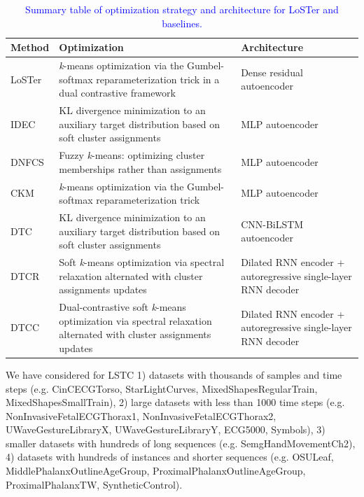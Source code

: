 \documentclass[times, review, 10pt]{elsarticle}
\begin{document}
\begin{table}[!tb]
  \caption{\textcolor{blue}{Summary table of optimization strategy and architecture for LoSTer and baselines.}}
  \label{summary-table}
  \vskip 0.1in
  \centering
  {\small
  \begin{tabularx}{\linewidth}{lX X}
    \toprule
    \textbf{Method} & \textbf{Optimization} & \textbf{Architecture}\\
    \midrule
    LoSTer & \textit{k}-means optimization via the Gumbel-softmax reparameterization trick in a dual contrastive framework & Dense residual autoencoder\\
    \midrule
    IDEC \cite{guo2017improved} & KL divergence minimization to an auxiliary target distribution based on soft cluster assignments & MLP autoencoder\\
    \midrule
    DNFCS \cite{feng2020deep} & Fuzzy \textit{k}-means: optimizing cluster memberships rather than assignments & MLP autoencoder\\
    \midrule
    CKM \cite{gao2020deep} & \textit{k}-means optimization via the Gumbel-softmax reparameterization trick & MLP autoencoder\\
    \midrule
    DTC \cite{madiraju2018deep} & KL divergence minimization to an auxiliary target distribution based on soft cluster assignments & CNN-BiLSTM autoencoder\\
    \midrule
    DTCR \cite{ma2019learning} & Soft \textit{k}-means optimization via spectral relaxation alternated with cluster assignments updates & Dilated RNN encoder + autoregressive single-layer RNN decoder\\
    \midrule
    DTCC \cite{zhong2023deep} & Dual-contrastive soft \textit{k}-means optimization via spectral relaxation alternated with cluster assignments updates & Dilated RNN encoder + autoregressive single-layer RNN decoder\\
    \bottomrule
  \end{tabularx}
  }
  \vskip -0.1in
\end{table}

We have considered for LSTC 1) datasets with thousands of samples and time steps (e.g. CinCECGTorso, StarLightCurves, MixedShapesRegularTrain, MixedShapesSmallTrain), 2) large datasets with less than 1000 time steps (e.g. NonInvasiveFetalECGThorax1, NonInvasiveFetalECGThorax2, UWaveGestureLibraryX, UWaveGestureLibraryY, ECG5000, Symbols), 3) smaller datasets with hundreds of long sequences (e.g. SemgHandMovementCh2), 4) datasets with hundreds of instances and shorter sequences (e.g. OSULeaf, MiddlePhalanxOutlineAgeGroup, ProximalPhalanxOutlineAgeGroup, ProximalPhalanxTW, SyntheticControl).
\end{document}
